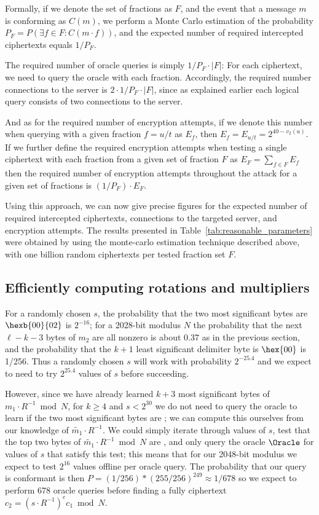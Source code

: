 Formally, if we denote the set of fractions as $F$, and the event that a message $m$ is conforming as $C(m)$, we perform a Monte Carlo estimation of the probability
$ P_F = P(\exists f \in F: C(m \cdot f)) $, and the expected number of required intercepted ciphertexts equals $1/{P_F}$.

The required number of oracle queries is simply $ 1/P_F \cdot |F| $: For each ciphertext, we need to query the oracle with each fraction.
Accordingly, the required number connections to the server is $ 2 \cdot 1/P_F \cdot |F| $, since as explained earlier each logical query consists of two connections to the server.

And as for the required number of encryption attempts, if we denote this number when querying with a given fraction $f = u/t$ as $E_f$, then
$E_f = E_{u/t} = 2^{40-v_2(u)}$.
If we further define the required encryption attempts when testing a single ciphertext with each fraction from a given set of fraction $F$ as
$E_F = \sum_{f \in F} E_f$
then the required number of encryption attempts throughout the attack for a given set of fractions is $(1/{P_F}) \cdot E_F$.

Using this approach, we can now give precise figures for the expected number of required intercepted ciphertexts, connections to the targeted server, and encryption attempts.
The results presented in Table~\ref{tab:reasonable_parameters} were obtained by using the monte-carlo estimation technique described above, with one billion random ciphertexts per tested fraction set $F$.

\subsection{Efficiently computing rotations and multipliers}
\label{sec:rotation-details}

For a randomly chosen $s$, the probability that the two most significant bytes are $\hexb{00}{02}$ is $2^{-16}$; for a 2028-bit modulus $N$ the probability that the next $\ell - k - 3$ bytes of $m_2$ are all nonzero is about 0.37 as in the previous section, and the probability that the $k+1$ least significant delimiter byte is $\hex{00}$ is 1/256.  Thus a randomly chosen $s$ will work with probability $2^{-25.4}$ and we expect to need to try $2^{25.4}$ values of $s$ before succeeding.

However, since we have already learned $k+3$ most significant bytes of $m_1 \cdot R^{-1} \bmod N$,
for $k \ge 4$ and $s < 2^{30}$ we do not need to query the oracle to learn if the two most significant bytes are \sslconform; we can compute this ourselves from our knowledge of $\tilde{m_1} \cdot R^{-1}$.  We could simply iterate through values of $s$, test that the top two bytes of $\tilde{m_1} \cdot R^{-1} \bmod N$ are \sslconform, and only query the oracle $\Oracle$ for values of $s$ that satisfy this test; this means that for our 2048-bit modulus we expect to test $2^{16}$ values offline per oracle query.  The probability that our query is conformant is then $P = (1/256) * (255/256)^{249} \approx 1/678$ so we expect to perform 678 oracle queries before finding a fully \sslconform ciphertext $c_2 = (s \cdot R^{-1})^e c_1 \bmod N$.

